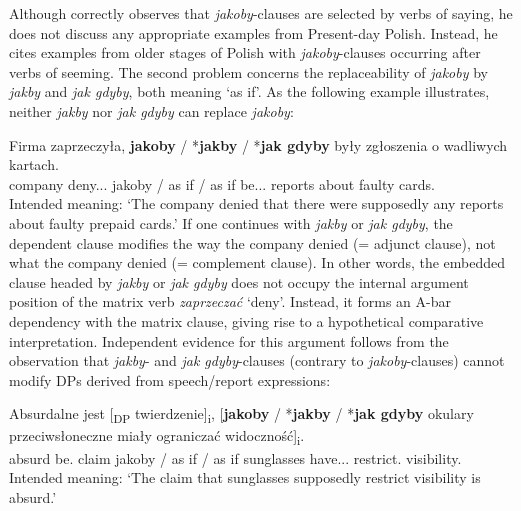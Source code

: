 \documentclass[output=paper
,modfonts
,nonflat]{langsci/langscibook}
\begin{document}
\noindent Although \textcite{Taborek2008} correctly observes that \emph{jakoby}-clauses are selected by verbs of saying, he does not discuss any appropriate examples from Present-day Polish. Instead, he cites examples from older stages of Polish with  \emph{jakoby}-clauses occurring after verbs of seeming. The second problem concerns the replaceability of \emph{jakoby} by  \emph{jakby} and \emph{jak gdyby}, both meaning `as if'. As the following example illustrates, neither \emph{jakby} nor \emph{jak gdyby} can replace \emph{jakoby}:

\ea \gll Firma zaprzeczyła, \textbf{jakoby} / *\textbf{jakby} / *\textbf{jak gdyby} były zgłoszenia o wadliwych kartach. \label{Taborek2} \\
		company deny.{\lptcp}.{\sg}.{\fem} jakoby / {as if} / {as if} be.{\lptcp}.{\nvir}.{\pl} reports about faulty cards.{\LOC} \\
\glt	Intended meaning: `The company denied that there were supposedly any reports about faulty prepaid cards.'
\z
If one continues  with \emph{jakby} or \emph{jak gdyby}, the dependent clause modifies the way the company denied (= adjunct clause), not what the company denied (= complement clause). In other words, the embedded clause headed by \emph{jakby} or \emph{jak gdyby} does not occupy the internal argument position of the matrix verb \emph{zaprzeczać} `deny'. Instead, it forms an A-bar dependency with the matrix clause, giving rise to a hypothetical comparative interpretation. Independent evidence for this argument follows from the observation that \emph{jakby}- and \emph{jak gdyby}-clauses (contrary to \emph{jakoby}-clauses) cannot modify DPs derived from speech\slash report expressions:

\ea \gll Absurdalne jest [\textsubscript{DP} twierdzenie]\textsubscript{i}, [\textbf{jakoby} / *\textbf{jakby} / *\textbf{jak gdyby}  {okulary przeciwsłoneczne} miały ograniczać widoczność]\textsubscript{i}. \\
		absurd be.{\thirdperson}{\sg} {} claim jakoby / {as if} / {as if} sunglasses have.{\lptcp}.{\nvir}.{\pl}  restrict.{\infv} visibility.{\acc} \\
\glt	Intended meaning: `The claim that  sunglasses supposedly restrict visibility is absurd.'
\z
\end{document}

